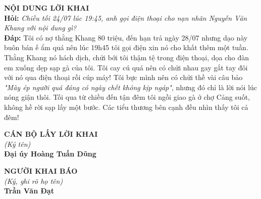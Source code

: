 \documentclass[12pt,a4paper]{article}
\begin{document}
\vspace{0.3cm}\noindent\textbf{\large NỘI DUNG LỜI KHAI}\\[0.15cm]


\noindent\textbf{Hỏi:} \textit{Chiều tối 24/07 lúc 19:45, anh gọi điện thoại cho nạn nhân Nguyễn Văn Khang với nội dung gì?}\\[0.15cm]
\noindent\textbf{Đáp:} Tôi có nợ thằng Khang 80 triệu, đến hạn trả ngày 28/07 nhưng dạo này buôn bán ế ẩm quá nên lúc 19h45 tôi gọi điện xin nó cho khất thêm một tuần. Thằng Khang nó hách dịch, chửi bới tôi thậm tệ trong điện thoại, dọa cho đàn em xuống dẹp sạp gà của tôi. Tôi cay cú quá nên có chửi nhau gay gắt tay đôi với nó qua điện thoại rồi cúp máy! Tôi bực mình nên có chửi thề vài câu bảo \textit{"Mày ép người quá đáng có ngày chết không kịp ngáp"}, nhưng đó chỉ là lời nói lúc nóng giận thôi. Tối qua từ chiều đến tận đêm tôi ngồi giao gà ở chợ Cảng suốt, không hề rời sạp lấy một bước. Các tiểu thương bên cạnh đều nhìn thấy tôi cả đêm!\\[0.35cm]
\vspace{0.8cm}
\noindent
\begin{minipage}[t]{0.48\textwidth}
    \begin{center}
        \textbf{CÁN BỘ LẤY LỜI KHAI}\\[0.1cm]
        \textit{(Ký tên)}\\[1.6cm]
        \textbf{Đại úy Hoàng Tuấn Dũng}
    \end{center}
\end{minipage}
\hfill
\begin{minipage}[t]{0.48\textwidth}
    \begin{center}
        \textbf{NGƯỜI KHAI BÁO}\\[0.1cm]
        \textit{(Ký, ghi rõ họ tên)}\\[1.6cm]
        \textbf{Trần Văn Đạt}
    \end{center}
\end{minipage}
\end{document}
